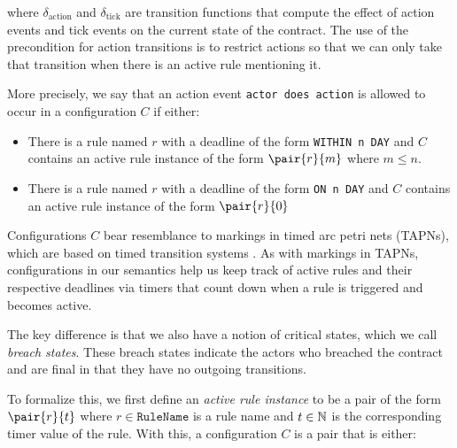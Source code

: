 \documentclass{article}
\begin{document}
where $\delta_\text{action}$ and $\delta_\text{tick}$ are transition functions
that compute the effect of action events and tick events on the current state
of the contract.
The use of the precondition for action transitions is to restrict actions so
that we can only take that transition when there is an active rule mentioning it.

More precisely, we say that an action event \texttt{actor does action} is allowed
to occur in a configuration $C$ if either:

\begin{itemize}
  \item
  There is a rule named $r$ with a deadline of the form
  \texttt{WITHIN n DAY}
  and $C$ contains an active rule instance of the form
  $\pair{r}{m}$ where $m \leq n$.

  \item
  There is a rule named $r$ with a deadline of the form
  \texttt{ON n DAY}
  and $C$ contains an active rule instance of the form
  $\pair{r}{0}$
\end{itemize}

Configurations $C$ bear resemblance to markings in timed arc petri nets
(TAPNs), which are based on timed transition systems .
As with markings in TAPNs, configurations in our semantics help us keep
track of active rules and their respective deadlines via timers that count down
when a rule is triggered and becomes active.

The key difference is that we also have a notion of critical states, which we
call \textit{breach states}.
These breach states indicate the actors who breached the contract and are final
in that they have no outgoing transitions.



To formalize this, we first define an \textit{active rule instance} to be a
pair of the form $\pair{r}{t}$ where $r \in \texttt{RuleName}$ is a rule name
and $t \in \operatorname{\mathbb{N}}$ is the corresponding timer value of the rule.
With this, a configuration $C$ is a pair that is either:
\end{document}
